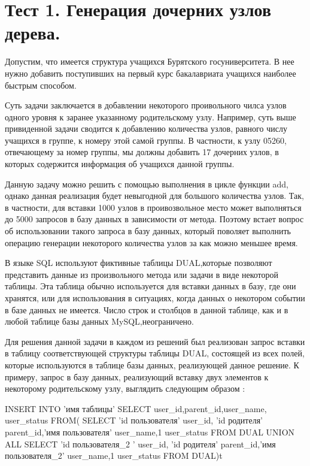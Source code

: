 \documentclass[a4paper,14pt]{extreport}
\theoremstyle{definition}
\begin{document}
\section{Тест 1. Генерация дочерних узлов дерева.}
Допустим, что имеется структура учащихся Бурятского госуниверситета. В нее нужно добавить поступивших на первый курс бакалавриата учащихся наиболее быстрым способом.

Суть задачи заключается в добавлении некоторого проивольного чилса узлов одного уровня к заранее указанному родительскому узлу. Например, суть выше привиденной задачи сводится к добавлению количества узлов, равного числу учащихся в группе, к номеру этой самой группы. В частности, к узлу 05260, отвечающему за номер группы, мы должны добавить 17 дочерних узлов, в которых содержится информация об учащихся данной группы.

Данную задачу можно решить с помощью выполнения в цикле функции add, однако данная реализация будет невыгодной для большого количества узлов. Так, в частности, для вставки 1000 узлов в проивозвольное место может выполняться до 5000 запросов в базу данных в зависимости от метода. Поэтому встает вопрос об использовании такого запроса в базу данных, который поволяет выполнить операцию генерации некоторого количества узлов за как можно меньшее время.

В языке SQL используют фиктивные таблицы DUAL,которые позволяют представить данные из произвольного метода или задачи в виде некоторой таблицы. Эта таблица обычно используется для вставки данных в базу, где они хранятся, или для использования в ситуациях, когда данных о некотором событии в базе данных не имеется.  Число строк и столбцов в данной таблице, как и в любой таблице базы данных MySQL,неограничено.

Для решения данной задачи в каждом из решений был реализован запрос вставки в таблицу соответствующей структуры таблицы DUAL, состоящей из всех полей, которые используются в таблице базы данных, реализующей данное решение. К примеру, запрос в базу данных, реализующий вставку двух элементов к некоторому родительскому узлу, выглядить следующим образом :

INSERT INTO 'имя таблицы'
    SELECT user\_id,parent\_id,user\_name,\\user\_status FROM(
    SELECT 'id пользователя' user\_id, 'id родителя' \\parent\_id,'имя пользователя' user\_name,1 user\_status FROM DUAL UNION ALL SELECT 'id пользователя\_2 ' user\_id, 'id родителя' parent\_id,'имя пользователя\_2' user\_name,1 user\_status FROM DUAL)t
\end{document}
